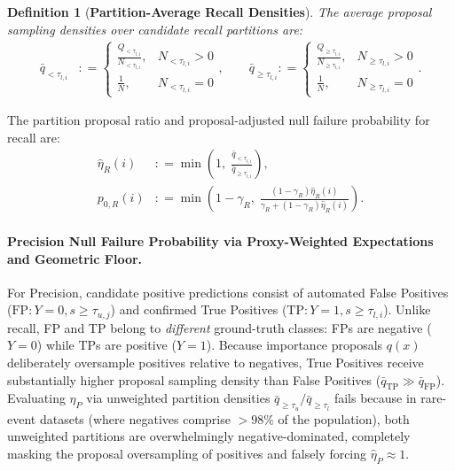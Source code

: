 \documentclass[11pt,a4paper]{article}
\newcommand{\coloneqq}{\mathrel{\mathop:}=}
\newtheorem{definition}{Definition}
\begin{document}
\begin{definition}[\textbf{Partition-Average Recall Densities}]\label{def:partition_densities}
The average proposal sampling densities over candidate recall partitions are:
\begin{align}
\bar{q}_{< \tau_{l, i}} &\coloneqq \begin{cases} \frac{Q_{< \tau_{l, i}}}{N_{< \tau_{l, i}}}, & N_{< \tau_{l, i}} > 0 \\ \frac{1}{N}, & N_{< \tau_{l, i}} = 0 \end{cases}, \qquad
\bar{q}_{\ge \tau_{l, i}} \coloneqq \begin{cases} \frac{Q_{\ge \tau_{l, i}}}{N_{\ge \tau_{l, i}}}, & N_{\ge \tau_{l, i}} > 0 \\ \frac{1}{N}, & N_{\ge \tau_{l, i}} = 0 \end{cases}.
\end{align}
\end{definition}

The partition proposal ratio and proposal-adjusted null failure probability for recall are:
\begin{align}
\hat{\eta}_R(i) &\coloneqq \min\left(1, \; \frac{\bar{q}_{< \tau_{l, i}}}{\bar{q}_{\ge \tau_{l, i}}}\right), \label{eq:eta_R_def} \\
p_{0, R}(i) &\coloneqq \min\left(1 - \gamma_R, \; \frac{(1 - \gamma_R)\hat{\eta}_R(i)}{\gamma_R + (1 - \gamma_R)\hat{\eta}_R(i)}\right). \label{eq:p0_R_def}
\end{align}

\paragraph{Precision Null Failure Probability via Proxy-Weighted Expectations and Geometric Floor.}
For Precision, candidate positive predictions consist of automated False Positives ($\text{FP}: Y=0, s \ge \tau_{u, j}$) and confirmed True Positives ($\text{TP}: Y=1, s \ge \tau_{l, i}$).
Unlike recall, FP and TP belong to \emph{different} ground-truth classes: FPs are negative ($Y=0$) while TPs are positive ($Y=1$).
Because importance proposals $q(x)$ deliberately oversample positives relative to negatives, True Positives receive substantially higher proposal sampling density than False Positives ($\bar{q}_{\text{TP}} \gg \bar{q}_{\text{FP}}$).
Evaluating $\eta_P$ via unweighted partition densities $\bar{q}_{\ge \tau_u} / \bar{q}_{\ge \tau_l}$ fails because in rare-event datasets (where negatives comprise $>98\%$ of the population), both unweighted partitions are overwhelmingly negative-dominated, completely masking the proposal oversampling of positives and falsely forcing $\hat{\eta}_P \approx 1$.
\end{document}
